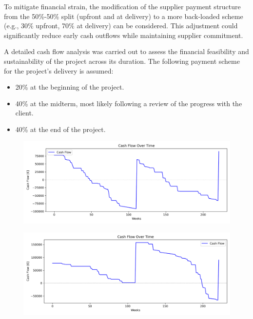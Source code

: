 To mitigate financial strain, the modification of the supplier payment structure from the 50\%-50\% split (upfront and at delivery) to a more back-loaded scheme (e.g., 30\% upfront, 70\% at delivery) can be considered.
This adjustment could significantly reduce early cash outflows while maintaining supplier commitment.

A detailed cash flow analysis was carried out to assess the financial feasibility and sustainability of the project across its duration. The following payment scheme for the project's delivery is assumed:
\begin{itemize}
    \item 20\% at the beginning of the project.
    \item 40\% at the midterm, most likely following a review of the progress with the client.
    \item 40\% at the end of the project.
\end{itemize}

\begin{figure}[p]
    \centering
            \begin{minipage}{\textwidth}
        \centering
        \includegraphics[width=\textwidth]{../cash_flow_E.png}
        \label{fig:cashflow_early}
    \end{minipage}\hfill
    \begin{minipage}{\textwidth}
        \centering
        \includegraphics[width=\textwidth]{../cash_flow_L.png}
        \label{fig:cashflow_late}
    \end{minipage}
\end{figure}

